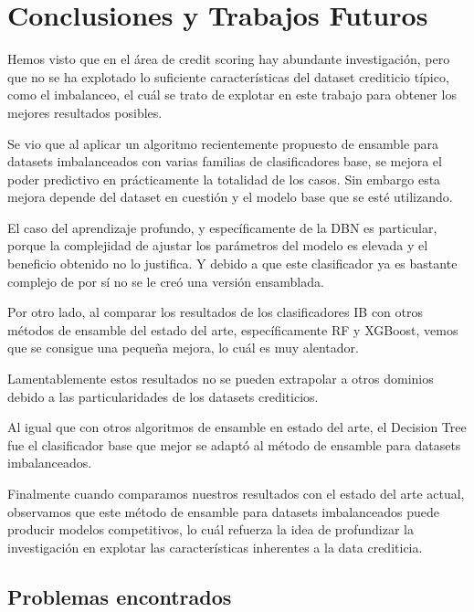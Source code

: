 \chapter{Conclusiones y Trabajos Futuros}\label{chap:conclusiones}


Hemos visto que en el área de credit scoring hay abundante investigación, pero que no se ha explotado lo suficiente características del dataset crediticio típico, como el imbalanceo, el cuál se trato de explotar en este trabajo para obtener los mejores resultados posibles.

Se vio que al aplicar un algoritmo recientemente propuesto de ensamble para datasets imbalanceados con varias familias de clasificadores base, se mejora el poder predictivo en prácticamente la totalidad de los casos. Sin embargo esta mejora depende del dataset en cuestión y el modelo base que se esté utilizando.

El caso del aprendizaje profundo, y específicamente de la \ac{DBN} es particular, porque la complejidad de ajustar los parámetros del modelo es elevada y el beneficio obtenido no lo justifica. Y debido a que este clasificador ya es bastante complejo de por sí no se le creó una versión ensamblada.

Por otro lado, al comparar los resultados de los clasificadores IB con otros métodos de ensamble del estado del arte, específicamente \ac{RF} y \ac{XGBoost}, vemos que se consigue una pequeña mejora, lo cuál es muy alentador.

Lamentablemente estos resultados no se pueden extrapolar a otros dominios debido a las particularidades de los datasets crediticios.

Al igual que con otros algoritmos de ensamble en estado del arte, el Decision Tree fue el clasificador base que mejor se adaptó al método de ensamble para datasets imbalanceados.

Finalmente cuando comparamos nuestros resultados con el estado del arte actual, observamos que este método de ensamble para datasets imbalanceados puede producir modelos competitivos, lo cuál refuerza la idea de profundizar la investigación en explotar las características inherentes a la data crediticia.

\section{Problemas encontrados}


